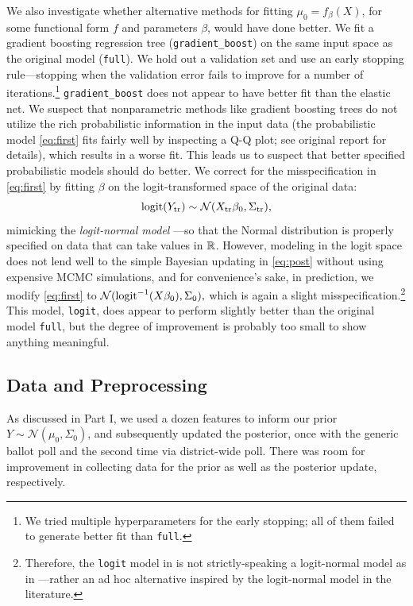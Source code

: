 \documentclass[12pt, letterpaper]{article}
\newcommand{\logit}{\operatorname{logit}}
\begin{document}
We also investigate whether alternative methods for fitting $\mu_0 = f_\beta(X)$, for some functional form $f$ and parameters $\beta$, would have done better. We fit a gradient boosting regression tree (\texttt{gradient\_boost}) on the same input space as the original model (\texttt{full}). We hold out a validation set and use an early stopping rule---stopping when the validation error fails to improve for a number of iterations.\footnote{We tried multiple hyperparameters for the early stopping; all of them failed to generate better fit than \texttt{full}.} \texttt{gradient\_boost} does not appear to have better fit than the elastic net. We suspect that nonparametric methods like gradient boosting trees do not utilize the rich probabilistic information in the input data (the probabilistic model \eqref{eq:first} fits fairly well by inspecting a Q-Q plot; see original report for details), which results in a worse fit. This leads us to suspect that better specified probabilistic models should do better. We correct for the misspecification in \eqref{eq:first} by fitting $\beta$ on the logit-transformed space of the original data: \[
\logit(Y_\text{tr}) \sim \Norm(X_\text{tr}\beta_0, \Sigma_\text{tr}),
\]
mimicking the \emph{logit-normal model} \cite[page 283]{agresti2015foundations}---so that the Normal distribution is properly specified on data that can take values in $\mathbb{R}$. However, modeling in the logit space does not lend well to the simple Bayesian updating in \eqref{eq:post} without using expensive MCMC simulations, and for convenience's sake, in prediction, we modify \eqref{eq:first} to $\Norm(\logit^{-1}(X\beta_0), \Sigma_0),$ which is again a slight misspecification.\footnote{Therefore, the \texttt{logit} model in  is not strictly-speaking a logit-normal model as in \cite{agresti2015foundations}---rather an ad hoc alternative inspired by the logit-normal model in the literature.} This model, \texttt{logit}, does appear to perform slightly better than the original model \texttt{full}, but the degree of improvement is probably too small to show anything meaningful. 


\subsection{Data and Preprocessing}
As discussed in Part I, we used a dozen features to inform our prior $Y \sim \mathcal{N}(\mu_0, \Sigma_0)$, and subsequently updated the posterior, once with the generic ballot poll and the second time via district-wide poll. There was room for improvement in collecting data for the prior as well as the posterior update, respectively.
\end{document}
